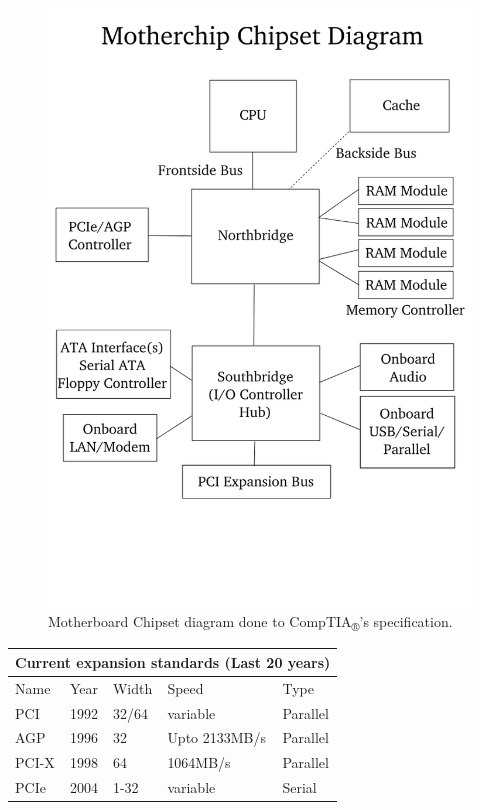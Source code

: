 \documentclass{article}
\begin{document}
\begin{figure}
  \includegraphics[width=\linewidth]{images/png/NorthBridge-SouthBridgeDiagram.png}
  \caption{Motherboard Chipset diagram done to CompTIA\textsubscript{®}'s specification.}
  \label{fig:NSBridge}
\end{figure}

\begin{tabular}{ |p{1cm}||p{1cm}|p{1cm}|p{2.5cm}|p{1.5cm}| }
 \hline
 \multicolumn{5}{|c|}{\textbf{Current expansion standards (Last 20 years)}} \\
 \hline
 Name & Year & Width & Speed & Type\\
 \hline
 PCI & 1992 & 32/64 & variable & Parallel\\
 AGP & 1996 & 32 & Upto 2133MB/s & Parallel\\
 PCI-X & 1998 & 64 & 1064MB/s & Parallel\\
 PCIe & 2004 & 1-32 & variable & Serial\\
 \hline
\end{tabular}
\end{document}
